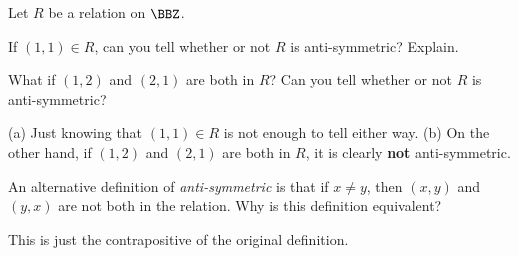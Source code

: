 \begin{ques}
Let $R$ be a relation on $\BBZ$.
\begin{lenum}
\item
If $(1,1)\in R$, can you tell whether or not $R$ is anti-symmetric? Explain.

\noindent
\answerlinetwo
\item
What if $(1,2)$ and $(2,1)$ are both in $R$?  Can you tell whether or not
$R$ is anti-symmetric?

\noindent
\answerlinetwo
\end{lenum}
\begin{answer}
(a) Just knowing that $(1,1)\in R$ is not enough to tell either way.
(b) On the other hand, if $(1,2)$ and $(2,1)$ are both in $R$, it is clearly
{\bf not} anti-symmetric.
\end{answer}
\end{ques}

\begin{ques}
An alternative definition of {\em anti-symmetric} is  that 
if $x\neq y$, then $(x,y)$ and $(y,x)$ are not both in the relation.
Why is this definition equivalent?

\noindent
\answerlinetwo
\begin{answer}
This is just the contrapositive of the original definition.
\end{answer}
\end{ques}

